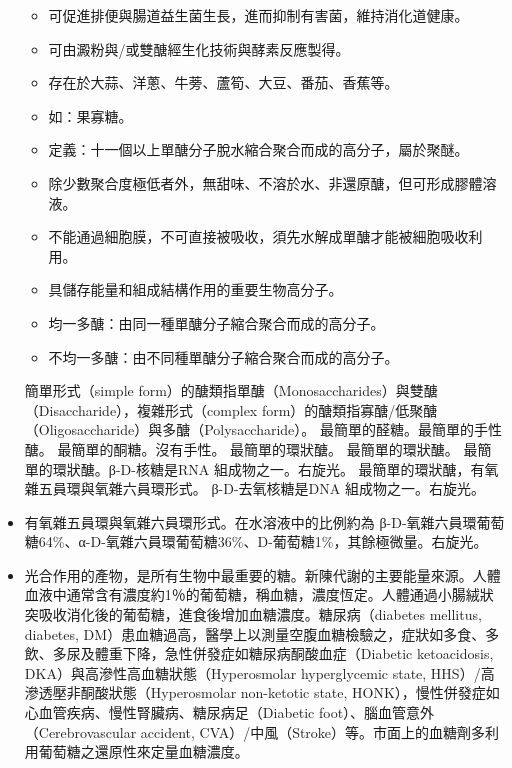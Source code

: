\documentclass[a4paper,12pt]{report}
\begin{document}
\begin{itemize}
\begin{itemize}
\item 可促進排便與腸道益生菌生長，進而抑制有害菌，維持消化道健康。
\item 可由澱粉與/或雙醣經生化技術與酵素反應製得。
\item 存在於大蒜、洋蔥、牛蒡、蘆筍、大豆、番茄、香蕉等。
\item 如：果寡糖。
\end{itemize}
\begin{itemize}
\item 定義：十一個以上單醣分子脫水縮合聚合而成的高分子，屬於聚醚。
\item 除少數聚合度極低者外，無甜味、不溶於水、非還原醣，但可形成膠體溶液。
\item 不能通過細胞膜，不可直接被吸收，須先水解成單醣才能被細胞吸收利用。
\item 具儲存能量和組成結構作用的重要生物高分子。
\item 均一多醣：由同一種單醣分子縮合聚合而成的高分子。
\item 不均一多醣：由不同種單醣分子縮合聚合而成的高分子。
\end{itemize}
簡單形式（simple form）的醣類指單醣（Monosaccharides）與雙醣（Disaccharide），複雜形式（complex form）的醣類指寡醣/低聚醣（Oligosaccharide）與多醣（Polysaccharide）。
最簡單的醛糖。最簡單的手性醣。
最簡單的酮糖。沒有手性。
最簡單的環狀醣。
最簡單的環狀醣。
最簡單的環狀醣。β-D-核糖是RNA 組成物之一。右旋光。
最簡單的環狀醣，有氧雜五員環與氧雜六員環形式。
β-D-去氧核糖是DNA 組成物之一。右旋光。
\bit
\item 有氧雜五員環與氧雜六員環形式。在水溶液中的比例約為 β-D-氧雜六員環葡萄糖64\%、α-D-氧雜六員環葡萄糖36\%、D-葡萄糖1\%，其餘極微量。右旋光。
\item 光合作用的產物，是所有生物中最重要的糖。新陳代謝的主要能量來源。人體血液中通常含有濃度約1％的葡萄糖，稱血糖，濃度恆定。人體通過小腸絨狀突吸收消化後的葡萄糖，進食後增加血糖濃度。糖尿病（diabetes mellitus, diabetes, DM）患血糖過高，醫學上以測量空腹血糖檢驗之，症狀如多食、多飲、多尿及體重下降，急性併發症如糖尿病酮酸血症（Diabetic ketoacidosis, DKA）與高滲性高血糖狀態（Hyperosmolar hyperglycemic state, HHS）/高滲透壓非酮酸狀態（Hyperosmolar non-ketotic state, HONK），慢性併發症如心血管疾病、慢性腎臟病、糖尿病足（Diabetic foot）、腦血管意外（Cerebrovascular accident, CVA）/中風（Stroke）等。市面上的血糖劑多利用葡萄糖之還原性來定量血糖濃度。

\end{itemize}
\end{document}

